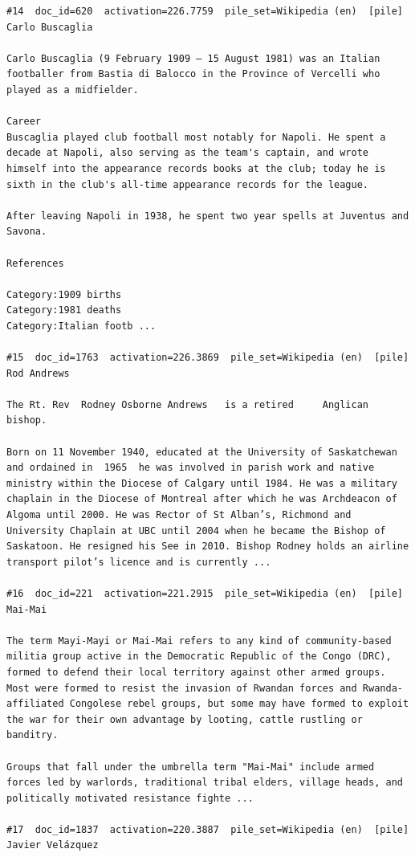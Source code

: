 \begin{verbatim}
#14  doc_id=620  activation=226.7759  pile_set=Wikipedia (en)  [pile]
Carlo Buscaglia

Carlo Buscaglia (9 February 1909 – 15 August 1981) was an Italian footballer from Bastia di Balocco in the Province of Vercelli who played as a midfielder.

Career
Buscaglia played club football most notably for Napoli. He spent a decade at Napoli, also serving as the team's captain, and wrote himself into the appearance records books at the club; today he is sixth in the club's all-time appearance records for the league.

After leaving Napoli in 1938, he spent two year spells at Juventus and Savona.

References

Category:1909 births
Category:1981 deaths
Category:Italian footb ...

#15  doc_id=1763  activation=226.3869  pile_set=Wikipedia (en)  [pile]
Rod Andrews

The Rt. Rev  Rodney Osborne Andrews   is a retired     Anglican bishop.

Born on 11 November 1940, educated at the University of Saskatchewan and ordained in  1965  he was involved in parish work and native ministry within the Diocese of Calgary until 1984. He was a military chaplain in the Diocese of Montreal after which he was Archdeacon of Algoma until 2000. He was Rector of St Alban’s, Richmond and University Chaplain at UBC until 2004 when he became the Bishop of Saskatoon. He resigned his See in 2010. Bishop Rodney holds an airline transport pilot’s licence and is currently ...

#16  doc_id=221  activation=221.2915  pile_set=Wikipedia (en)  [pile]
Mai-Mai

The term Mayi-Mayi or Mai-Mai refers to any kind of community-based militia group active in the Democratic Republic of the Congo (DRC), formed to defend their local territory against other armed groups. Most were formed to resist the invasion of Rwandan forces and Rwanda-affiliated Congolese rebel groups, but some may have formed to exploit the war for their own advantage by looting, cattle rustling or banditry.

Groups that fall under the umbrella term "Mai-Mai" include armed forces led by warlords, traditional tribal elders, village heads, and politically motivated resistance fighte ...

#17  doc_id=1837  activation=220.3887  pile_set=Wikipedia (en)  [pile]
Javier Velázquez


\end{verbatim}
